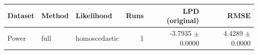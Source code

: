 \begin{tabular}{lllrrr}
\toprule
Dataset & Method & Likelihood & Runs & LPD (original) & RMSE \\
\midrule
Power & full & homoscedastic & 1 & -3.7935 $\pm$ 0.0000 & 4.4289 $\pm$ 0.0000 \\
\bottomrule
\end{tabular}
